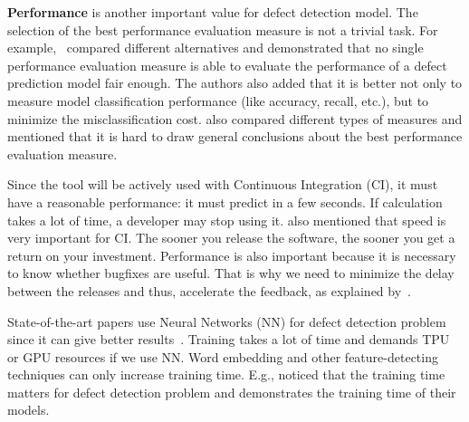 \textbf{Performance} is another important value for defect detection model. 
The selection of the best performance evaluation measure 
is not a trivial task.
For example,~\citet{Jiang2008} compared different alternatives
and demonstrated that no single performance evaluation measure is able to evaluate the
performance of a defect prediction model fair enough. The authors also added 
that it is better not only to measure model classification performance 
(like accuracy, recall, etc.), but to minimize the misclassification cost.
\citet{ARISHOLM20102} also compared different types of measures 
and mentioned that it is hard to draw general conclusions about the 
best performance evaluation measure.

Since the tool will be actively used with Continuous Integration (CI), 
it must have a reasonable performance: it must predict in a few seconds. 
If calculation takes a lot of time, a developer may stop using it.
\citet{humble2010continuous} also mentioned that speed 
is very important for CI. The sooner you release the software, 
the sooner you get a return on your investment. 
Performance is also important because it is necessary 
to know whether bugfixes are useful. That is why
we need to minimize the delay between the releases and 
thus, accelerate the feedback, as explained by~\citet{humble2010continuous}.

State-of-the-art papers use Neural Networks (NN) for defect 
detection problem since it can give better results~\citep{XIAO201917,10.1145/3360588}. 
Training takes a lot of time and demands TPU or GPU resources if we use NN. 
Word embedding and other feature-detecting techniques can only increase training time. 
E.g., \citet{10.1145/3360588, 8616596} noticed that 
the training time matters for defect detection problem and 
demonstrates the training time of their models.

